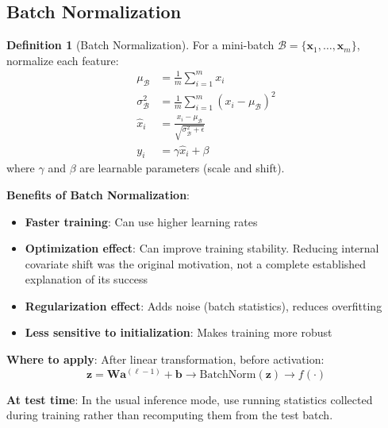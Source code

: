 \documentclass[11pt,twoside]{article}
\numberwithin{equation}{section}
\newcommand{\vect}[1]{\bm{#1}}
\theoremstyle{plain}
\theoremstyle{definition}
\newtheorem{definition}[theorem]{Definition}
\theoremstyle{remark}
\newenvironment{keyidea}{
  \begin{tcolorbox}[colback=yellow!5!white,
                    colframe=yellow!50!black,
                    title=Key Idea,
                    breakable,
                    enhanced,
                    sharp corners,
                    boxrule=0.8pt,
                    left=6pt, right=6pt, top=6pt, bottom=6pt]
}{
  \end{tcolorbox}
}
\begin{document}
\subsection{Batch Normalization}

\begin{definition}[Batch Normalization]
For a mini-batch $\mathcal{B} = \{\vect{x}_1, \ldots, \vect{x}_m\}$, normalize each feature:
\begin{align}
\mu_{\mathcal{B}} &= \frac{1}{m}\sum_{i=1}^m x_i \\
\sigma_{\mathcal{B}}^2 &= \frac{1}{m}\sum_{i=1}^m (x_i - \mu_{\mathcal{B}})^2 \\
\hat{x}_i &= \frac{x_i - \mu_{\mathcal{B}}}{\sqrt{\sigma_{\mathcal{B}}^2 + \epsilon}} \\
y_i &= \gamma \hat{x}_i + \beta
\end{align}
where $\gamma$ and $\beta$ are learnable parameters (scale and shift).
\end{definition}

\begin{keyidea}
\textbf{Benefits of Batch Normalization}:
\begin{itemize}
\item \textbf{Faster training}: Can use higher learning rates
\item \textbf{Optimization effect}: Can improve training stability. Reducing internal covariate shift was the original motivation, not a complete established explanation of its success
\item \textbf{Regularization effect}: Adds noise (batch statistics), reduces overfitting
\item \textbf{Less sensitive to initialization}: Makes training more robust
\end{itemize}

\textbf{Where to apply}: After linear transformation, before activation:
\[
\vect{z} = \vect{W}\vect{a}^{(\ell-1)} + \vect{b} \to \text{BatchNorm}(\vect{z}) \to f(\cdot)
\]

\textbf{At test time}: In the usual inference mode, use running statistics collected during training rather than recomputing them from the test batch.
\end{keyidea}
\end{document}
